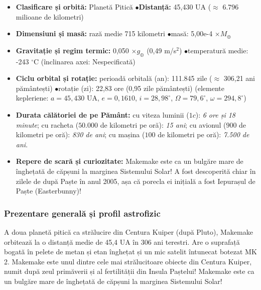 \begin{tcolorbox}[orbitardata, title={\textbf{Repere esențiale: Makemake}}]
\small
\begin{itemize}[leftmargin=1.4em, itemsep=2pt, topsep=2pt]
  \item \textbf{Clasificare și orbită:} Planetă Pitică \quad$\bullet$\quad \textbf{Distanță:} 45,430 UA ($\approx$ 6.796 milioane de kilometri)
  \item \textbf{Dimensiuni și masă:} rază medie 715 kilometri \quad$\bullet$\quad masă: 5,00e-4 $\times M_\oplus$
  \item \textbf{Gravitație și regim termic:} 0,050 $\times g_\oplus$ (0,49 m/s$^2$) \quad$\bullet$\quad temperatură medie: -243 $^\circ$C (înclinarea axei: Nespecificată)
  \item \textbf{Ciclu orbital și rotație:} perioadă orbitală (an): 111.845 zile ($\approx$ 306,21 ani pământești) \quad$\bullet$\quad rotație (zi): 22,83 ore (0,95 zile pământești) (elemente kepleriene: $a = 45,430$ UA, $e = 0,1610$, $i = 28,98^\circ$, $\Omega = 79,6^\circ$, $\omega = 294,8^\circ$)
  \item \textbf{Durata călătoriei de pe Pământ:} cu viteza luminii ($1c$): \emph{6 ore și 18 minute}; cu racheta ($50.000$ de kilometri pe oră): \emph{15 ani}; cu avionul ($900$ de kilometri pe oră): \emph{830 de ani}; cu mașina ($100$ de kilometri pe oră): \emph{7.500 de ani}.
  \item \textbf{Repere de scară și curiozitate:} Makemake este ca un bulgăre mare de înghețată de căpșuni la marginea Sistemului Solar! A fost descoperită chiar în zilele de după Paște în anul 2005, așa că porecla ei inițială a fost \guillemotleft{}Iepurașul de Paște\guillemotright{} (Easterbunny)!
\end{itemize}
\end{tcolorbox}

\subsubsection*{Prezentare generală și profil astrofizic}
A doua planetă pitică ca strălucire din Centura Kuiper (după Pluto), Makemake orbitează la o distanță medie de 45,4 UA în 306 ani terestri. Are o suprafață bogată în pelete de metan și etan înghețat și un mic satelit întunecat botezat MK 2. Makemake este unul dintre cele mai strălucitoare obiecte din Centura Kuiper, numit după zeul primăverii și al fertilității din Insula Paștelui! Makemake este ca un bulgăre mare de înghețată de căpșuni la marginea Sistemului Solar!

